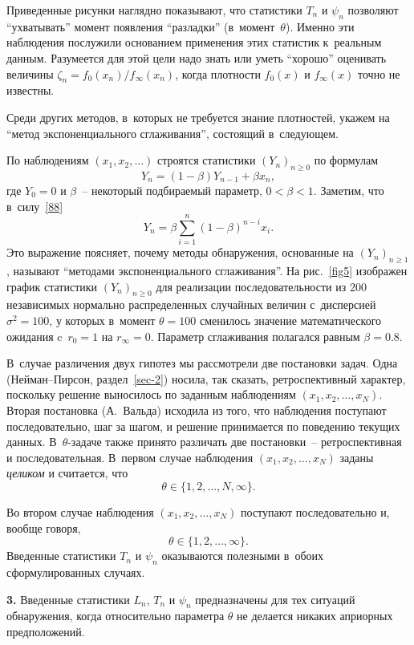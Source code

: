 Приведенные рисунки наглядно показывают, что статистики $T_n$ и
$\psi_n$ позволяют ``ухватывать'' момент появления ``разладки''
(в~момент~$\theta$). Именно эти наблюдения послужили основанием
применения этих статистик к~реальным данным. Разумеется для этой
цели надо знать или уметь ``хорошо'' оценивать величины
$\zeta_n=f_0(x_n)/f_{\infty}(x_n)$, когда плотности $f_0(x)$ и
$f_{\infty}(x)$ точно не известны.

Среди других методов, в~которых не требуется знание плотностей,
укажем на ``метод экспоненциального сглаживания'', состоящий
в~следующем.

По наблюдениям $(x_1,x_2,\ldots)$ строятся статистики
$(Y_n)_{n\ge0}$ по формулам
\begin{equation}
\label{88}%
    Y_n=(1-\beta)Y_{n-1}+\beta x_n,
\end{equation}
где $Y_0=0$ и $\beta$~-- некоторый подбираемый параметр,
$0<\beta<1$. Заметим, что в~силу~\eqref{88}
\begin{equation}
\label{89}%
    Y_n=\beta\sum_{i=1}^n(1-\beta)^{n-i}x_i.
\end{equation}
Это выражение поясняет, почему методы обнаружения, основанные на
$(Y_n)_{n\ge1}$, называют ``методами экспоненциального
сглаживания''. На рис.~\ref{fig5} изображен график статистики
$(Y_n)_{n\ge0}$ для реализации последовательности из 200
независимых нормально распределенных случайных величин
с~дисперсией $\sigma^2=100$, у которых в~момент $\theta=100$
сменилось значение математического ожидания c~$r_0=1$ на
$r_{\infty}=0$. Параметр сглаживания полагался равным $\beta=0.8$.


В~случае различения двух гипотез мы рассмотрели две постановки
задач. Одна (Нейман--Пирсон, раздел~\ref{sec-2}) носила, так
сказать, ретроспективный характер, поскольку решение выносилось по
заданным наблюдениям $(x_1,x_2,\ldots,x_N)$. Вторая постановка
(А.~Вальда) исходила из того, что наблюдения поступают
последовательно, шаг за шагом, и решение принимается по поведению
текущих данных. В~$\theta$-задаче также принято различать две
постановки~-- ретроспективная и последовательная. В~первом случае
наблюдения $(x_1,x_2,\ldots,x_N)$ заданы \textit{целиком} и
считается, что
\[
\theta\in\{1,2,\ldots,N,\infty\}.
\]

Во втором случае наблюдения $(x_1,x_2,\ldots,x_N)$ поступают
последовательно и, вообще говоря,
\[
\theta\in\{1,2,\ldots,\infty\}.
\]
Введенные статистики $T_n$ и $\psi_n$ оказываются полезными
в~обоих сформулированных случаях.

\textbf{3.} Введенные статистики $L_n$, $T_n$ и $\psi_n$
предназначены для тех ситуаций обнаружения, когда относительно
параметра $\theta$ не делается никаких априорных предположений.

